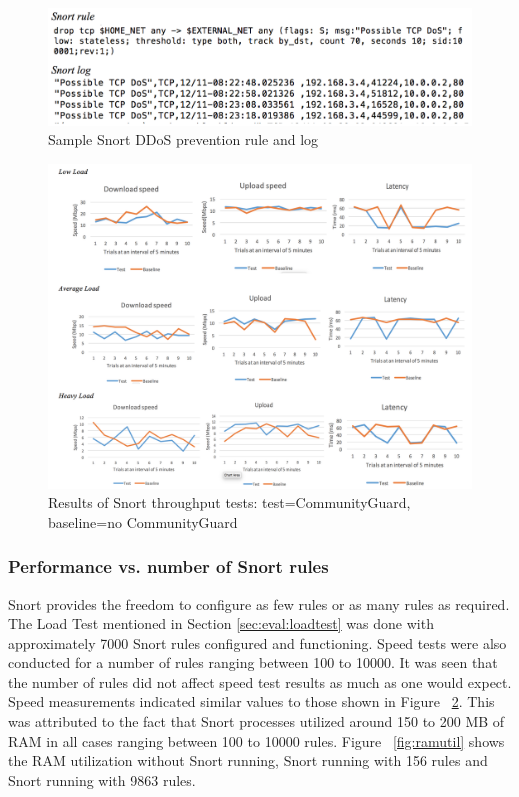 \begin{figure}
	\centering
	\includegraphics[width=\columnwidth]{figs/ddosrule.png}
	\caption{Sample Snort DDoS prevention rule and log}
	\label{fig:snortrule1}
\end{figure}

\begin{figure}
	\centering
	\includegraphics[width=0.75\linewidth]{figs/graph.png}
	\caption{Results of Snort throughput tests: test=CommunityGuard, baseline=no CommunityGuard}
	\label{fig:graph}
\end{figure}

\subsubsection{Performance vs. number of Snort rules}
\label{}
Snort provides the freedom to configure as few rules or as many rules as required. The Load Test mentioned in Section \ref{sec:eval:loadtest} was done with approximately 7000 Snort rules configured and functioning. Speed tests were also conducted for a number of rules ranging between 100 to 10000. It was seen that the number of rules did not affect speed test results as much as one would expect. Speed measurements indicated similar values to those shown in Figure ~\ref{fig:graph}. This was attributed to the fact that Snort processes utilized around 150 to 200 MB of RAM in all cases ranging between 100 to 10000 rules. Figure ~\ref{fig:ramutil} shows the RAM utilization without Snort running, Snort running with 156 rules and Snort running with 9863 rules. 

